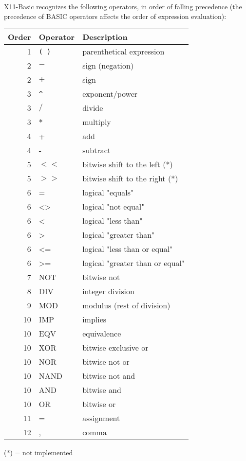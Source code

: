 X11-Basic recognizes the following operators, in order of falling precedence 
(the precedence of BASIC operators affects the order of expression evaluation):
\begin{center}
\begin{longtable}{|r|l|l|}
\hline
{\bf Order}&{\bf Operator}  &  {\bf Description} \\
\hline
1&\verb|( )|&  parenthetical expression\\
2&$-$	  &    sign (negation)         \\
2&$+$	  &    sign		       \\
3&\verb|^|&    exponent/power	       \\
3&$/$	  &    divide 	               \\
3&*	  &    multiply 	       \\
4&+	  &    add			      \\
4&-	  &    subtract 		      \\
5&$<<$	  &    bitwise shift to the left  (*) \\
5&$>>$	  &    bitwise shift to the right (*) \\
6&=	  &    logical "equals" 	      \\
6&<>	  &    logical "not equal"	      \\
6&<	  &    logical "less than"	      \\
6&>	  &    logical "greater than"	      \\
6&<=	  &    logical "less than or equal"   \\
6&>=	  &    logical "greater than or equal"\\
7&NOT	  &    bitwise not	       \\
8&DIV     &    integer division        \\
9&MOD	  &    modulus (rest of division)     \\
10&IMP	  &    implies  		      \\
10&EQV	  &    equivalence		      \\
10&XOR	  &    bitwise exclusive or	      \\
10&NOR	  &    bitwise not or		      \\
10&NAND	  &    bitwise not and		      \\
10&AND	  &    bitwise and		      \\
10&OR	  &    bitwise or		      \\
11& =	  &    assignment \\ 
12& ,	  &    comma \\ 
\hline
\end{longtable}
\end{center}
(*) = not implemented

